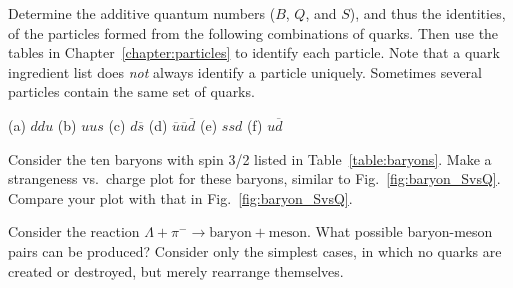 \begin{problem}
Determine the additive quantum numbers ($B$, $Q$, and $S$), and
  thus the identities, of the particles formed from the following
  combinations of quarks.  Then use the tables in
  Chapter~\ref{chapter:particles} to identify each particle.  Note that a
  quark ingredient list does {\em not} always identify a particle
  uniquely.  Sometimes several particles contain the same set of
  quarks.\par\medskip
  (a) $ddu$ \qquad (b) $uus$ \qquad (c) $d\overline s$
  \qquad (d) $\overline u\overline u\overline d$ \qquad (e) $ssd$
  \qquad (f) $u\overline d$
\label{prob:identify_from_quarks}
\end{problem}

\begin{problem}
Consider the ten baryons with spin 3/2 listed in
  Table~\ref{table:baryons}.  Make a strangeness vs.\ charge plot
  for these baryons, similar to Fig.~\ref{fig:baryon_SvsQ}.
  Compare your plot with that in Fig.~\ref{fig:baryon_SvsQ}.
\label{prob:strangeness_vs_charge_plot}
\end{problem}

\begin{problem}
Consider the reaction $\Lambda + \pi^- \to \mbox{baryon} +
  \mbox{meson}$.  What possible baryon-meson pairs can be produced?
  Consider only the simplest cases, in which no quarks are created or
  destroyed, but merely rearrange themselves.
\label{prob:reaction_products}
\end{problem}

\newpage
\thispagestyle{empty}

